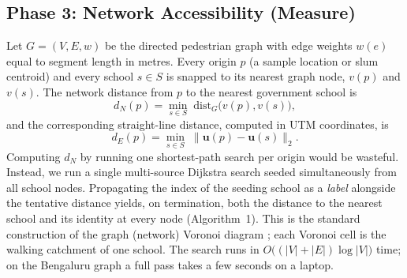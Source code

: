 \documentclass[conference]{IEEEtran}
\begin{document}
\subsection{Phase 3: Network Accessibility (Measure)}
Let $G=(V,E,w)$ be the directed pedestrian graph with edge weights $w(e)$ equal to segment length in metres. Every origin $p$ (a sample location or slum centroid) and every school $s\in S$ is snapped to its nearest graph node, $v(p)$ and $v(s)$. The network distance from $p$ to the nearest government school is
\begin{equation}
d_N(p)=\min_{s\in S}\; \mathrm{dist}_G\big(v(p),v(s)\big),
\end{equation}
and the corresponding straight-line distance, computed in UTM coordinates, is
\begin{equation}
d_E(p)=\min_{s\in S}\; \lVert \mathbf{u}(p)-\mathbf{u}(s)\rVert_2 .
\end{equation}
Computing $d_N$ by running one shortest-path search per origin would be wasteful. Instead, we run a single multi-source Dijkstra search \cite{dijkstra1959} seeded simultaneously from all school nodes. Propagating the index of the seeding school as a \emph{label} alongside the tentative distance yields, on termination, both the distance to the nearest school and its identity at every node (Algorithm~1). This is the standard construction of the graph (network) Voronoi diagram \cite{erwig2000,okabe2008}; each Voronoi cell is the walking catchment of one school. The search runs in $O\big((|V|+|E|)\log|V|\big)$ time; on the Bengaluru graph a full pass takes a few seconds on a laptop.
\end{document}
